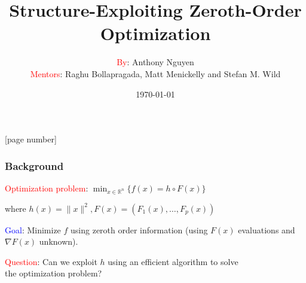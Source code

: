 \documentclass{beamer}
\title[LANS Seminar]
{Structure-Exploiting Zeroth-Order Optimization}
\author[Speaker]{\textcolor{red}{By}: Anthony Nguyen \\ \textcolor{red}{Mentors}: Raghu Bollapragada, Matt Menickelly and Stefan M. Wild}
\subtitle{}
\institute[ANL/MCS]{Argonne National Laboratory}
\date{\today}
\begin{document}
{
\frame{\titlepage}
}

[page number]{}

\begin{frame}
  \frametitle{Background}
  \textcolor{red}{Optimization problem}: $\min_{x \in \mathbb{R}^n}\{f(x) = h \circ F(x)\}$ \vspace{0.25in}
  
   \quad \quad where $h(x) = \|x\|^2, F(x) = (F_1(x),\dots,F_p(x))$ \vspace{0.5in}
  
  \textcolor{blue}{Goal}: Minimize $f$ using zeroth order information (using $F(x)$ evaluations and $\nabla F(x)$ unknown). \newline \vspace{0.5in}
  
  
  \textcolor{red}{Question}: Can we exploit $h$ using an efficient algorithm to solve \\ \quad \quad  the optimization problem? 
\end{frame}
\end{document}
